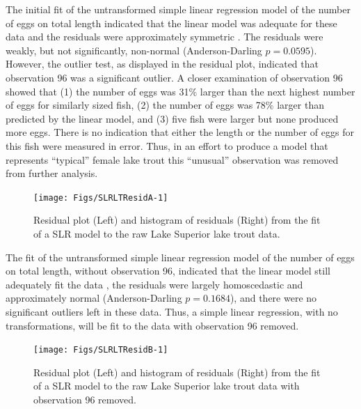\documentclass[10pt,openany]{book}\usepackage[]{graphicx}\usepackage[]{color}
\newenvironment{knitrout}{}{} %
\begin{document}
The initial fit of the untransformed simple linear regression model of the number of eggs on total length indicated that the linear model was adequate for these data  and the residuals were approximately symmetric .  The residuals were weakly, but not significantly, non-normal (Anderson-Darling $p=0.0595$).  However, the outlier test, as displayed in the residual plot, indicated that observation 96 was a significant outlier.  A closer examination of observation 96 showed that (1) the number of eggs was 31\% larger than the next highest number of eggs for similarly sized fish, (2) the number of eggs was 78\% larger than predicted by the linear model, and (3) five fish were larger but none produced more eggs.  There is no indication that either the length or the number of eggs for this fish were measured in error.  Thus, in an effort to produce a model that represents ``typical'' female lake trout this ``unusual'' observation was removed from further analysis.

\begin{knitrout}
\color{fgcolor}\begin{figure}[h]

{\centering \texttt{[image: Figs/SLRLTResidA-1]} 

}

\caption[Residual plot (Left) and histogram of residuals (Right) from the fit of a SLR model to the raw Lake Superior lake trout data]{Residual plot (Left) and histogram of residuals (Right) from the fit of a SLR model to the raw Lake Superior lake trout data.}\label{fig:SLRLTResidA}
\end{figure}


\end{knitrout}



The fit of the untransformed simple linear regression model of the number of eggs on total length, without observation 96, indicated that the linear model still adequately fit the data , the residuals were largely homoscedastic  and approximately normal (Anderson-Darling $p=0.1684$), and there were no significant outliers left in these data.  Thus, a simple linear regression, with no transformations, will be fit to the data with observation 96 removed.

\begin{knitrout}
\color{fgcolor}\begin{figure}[h]

{\centering \texttt{[image: Figs/SLRLTResidB-1]} 

}

\caption[Residual plot (Left) and histogram of residuals (Right) from the fit of a SLR model to the raw Lake Superior lake trout data with observation 96 removed]{Residual plot (Left) and histogram of residuals (Right) from the fit of a SLR model to the raw Lake Superior lake trout data with observation 96 removed.}\label{fig:SLRLTResidB}
\end{figure}


\end{knitrout}
\end{document}
